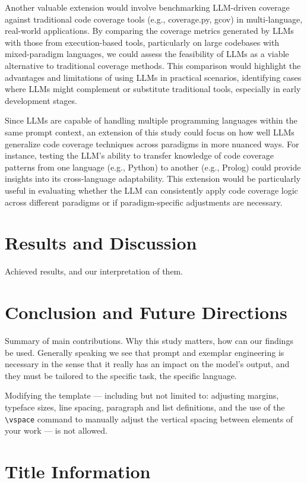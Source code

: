 \documentclass[sigconf]{acmart}
\begin{document}
Another valuable extension would involve benchmarking LLM-driven coverage against traditional code coverage tools (e.g., coverage.py, gcov) in multi-language, real-world applications. By comparing the coverage metrics generated by LLMs with those from execution-based tools, particularly on large codebases with mixed-paradigm languages, we could assess the feasibility of LLMs as a viable alternative to traditional coverage methods. This comparison would highlight the advantages and limitations of using LLMs in practical scenarios, identifying cases where LLMs might complement or substitute traditional tools, especially in early development stages.

Since LLMs are capable of handling multiple programming languages within the same prompt context, an extension of this study could focus on how well LLMs generalize code coverage techniques across paradigms in more nuanced ways. For instance, testing the LLM’s ability to transfer knowledge of code coverage patterns from one language (e.g., Python) to another (e.g., Prolog) could provide insights into its cross-language adaptability. This extension would be particularly useful in evaluating whether the LLM can consistently apply code coverage logic across different paradigms or if paradigm-specific adjustments are necessary.

\section{Results and Discussion}
Achieved results, and our interpretation of them.

\section{Conclusion and Future Directions}
Summary of main contributions. Why this study matters, how can our findings be used. Generally speaking we see that prompt and exemplar engineering is necessary in the sense that it really has an impact on the model's output, and they must be tailored to the specific task, the specific language.

\iffalse
	Modifying the template --- including but not limited to: adjusting
	margins, typeface sizes, line spacing, paragraph and list definitions,
	and the use of the \verb|\vspace| command to manually adjust the
	vertical spacing between elements of your work --- is not allowed.

	\section{Title Information}
\end{document}
